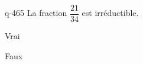\begin{truefalse}{q-465}
La fraction $\dfrac{21}{34}$ est irréductible.
\item* Vrai
\item Faux
\end{truefalse}

